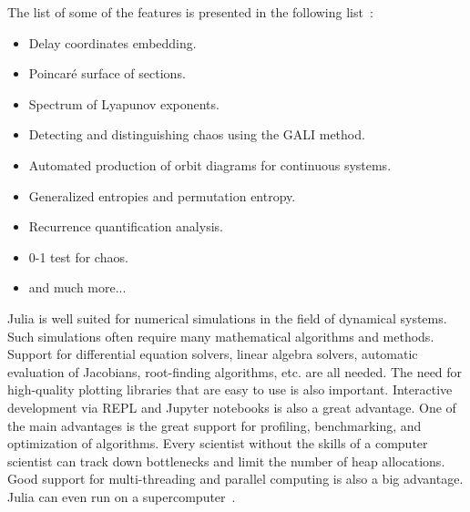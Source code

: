 \par
The list of some of the features is presented in the following list~\cite{DynamicalSystems2024}:
\begin{itemize}
    \item Delay coordinates embedding.
    \item Poincaré surface of sections.
    \item Spectrum of Lyapunov exponents.
    \item Detecting and distinguishing chaos using the GALI method.
    \item Automated production of orbit diagrams for continuous systems.
    \item Generalized entropies and permutation entropy.
    \item Recurrence quantification analysis.
    \item 0-1 test for chaos.
    \item and much more...
\end{itemize}

\par
Julia is well suited for numerical simulations in the field of dynamical systems.
Such simulations often require many mathematical algorithms and methods.
Support for differential equation solvers, linear algebra solvers, automatic evaluation of Jacobians, root-finding algorithms, etc. are all needed.
The need for high-quality plotting libraries that are easy to use is also important.
Interactive development via REPL and Jupyter notebooks is also a great advantage.
One of the main advantages is the great support for profiling, benchmarking, and optimization of algorithms.
Every scientist without the skills of a computer scientist can track down bottlenecks and limit the number of heap allocations.
Good support for multi-threading and parallel computing is also a big advantage.
Julia can even run on a supercomputer~\cite{Regier2016-vq}.

